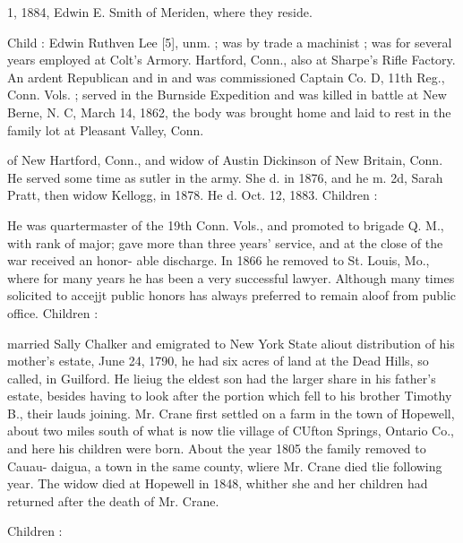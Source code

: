 \documentclass{book}
\begin{document}
1, 1884, Edwin E. Smith of Meriden, where they reside. 

Child : 
Edwin Ruthven Lee [5], unm. ; was by trade a machinist ; was 
for several years employed at Colt's Armory. Hartford, Conn., 
also at Sharpe's Rifle Factory. An ardent Republican and in 
and was commissioned Captain Co. D, 11th Reg., Conn. Vols. ; 
served in the Burnside Expedition and was killed in battle at 
New Berne, N. C, March 14, 1862, the body was brought 
home and laid to rest in the family lot at Pleasant Valley, Conn. 


of New Hartford, Conn., and widow of Austin Dickinson of 
New Britain, Conn. He served some time as sutler in the 
army. She d. in 1876, and he m. 2d, Sarah Pratt, then 
widow Kellogg, in 1878. He d. Oct. 12, 1883. Children : 





He was quartermaster of the 19th Conn. Vols., and promoted 
to brigade Q. M., with rank of major; gave more than three 
years' service, and at the close of the war received an honor- 
able discharge. In 1866 he removed to St. Louis, Mo., where 
for many years he has been a very successful lawyer. 
Although many times solicited to accejjt public honors has 
always preferred to remain aloof from public office. Children : 






married Sally Chalker and emigrated to New York State aliout 
distribution of his mother's estate, June 24, 1790, he had six 
acres of land at the Dead Hills, so called, in Guilford. He lieiug 
the eldest son had the larger share in his father's estate, besides 
having to look after the portion which fell to his brother Timothy 
B., their lauds joining. Mr. Crane first settled on a farm in the 
town of Hopewell, about two miles south of what is now tlie 
village of CUfton Springs, Ontario Co., and here his children 
were born. About the year 1805 the family removed to Cauau- 
daigua, a town in the same county, wliere Mr. Crane died tlie 
following year. The widow died at Hopewell in 1848, whither 
she and her children had returned after the death of Mr. Crane. 

Children : 
\end{document}
